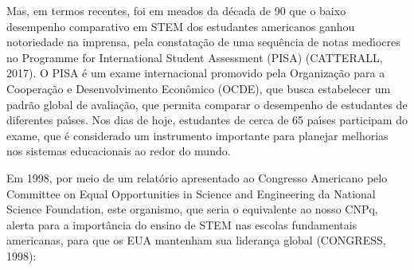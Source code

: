 \documentclass[
12pt,		%
openright,	%
twoside,  %
a4paper,			%
chapter=TITLE,		%
english,			%
french,				%
spanish,			%
brazil				%
]{USPSC-classe/USPSC}
\begin{document}
\noindent\begin{center}\mbox{\centering{}}\end{center}


Mas, em termos recentes, foi em meados da d\'ecada de 90 que o baixo desempenho comparativo em STEM dos estudantes americanos ganhou notoriedade na imprensa, pela constata\c{c}\~ao de uma sequ\^encia de notas med\'{\i}ocres no Programme for International Student Assessment (PISA)  (CATTERALL, 2017). O PISA \'e um exame internacional promovido pela Organiza\c{c}\~ao para a Coopera\c{c}\~ao e Desenvolvimento Econ\^omico (OCDE), que busca estabelecer um padr\~ao global de avalia\c{c}\~ao, que permita comparar o desempenho de estudantes de diferentes pa\'{\i}ses. Nos dias de hoje, estudantes de cerca de 65 pa\'{\i}ses participam do exame, que \'e considerado um instrumento importante para planejar melhorias nos sistemas educacionais ao redor do mundo.








Em 1998, por meio de um relat\'orio apresentado ao Congresso Americano pelo Committee on Equal Opportunities in Science and Engineering da National Science Foundation, este organismo, que seria o equivalente ao nosso CNPq, alerta para a import\^ancia do ensino de STEM nas escolas fundamentais americanas, para que os EUA mantenham sua lideran\c{c}a global  (CONGRESS, 1998):









\noindent\begin{center}\mbox{\centering{}}\end{center}
\end{document}
